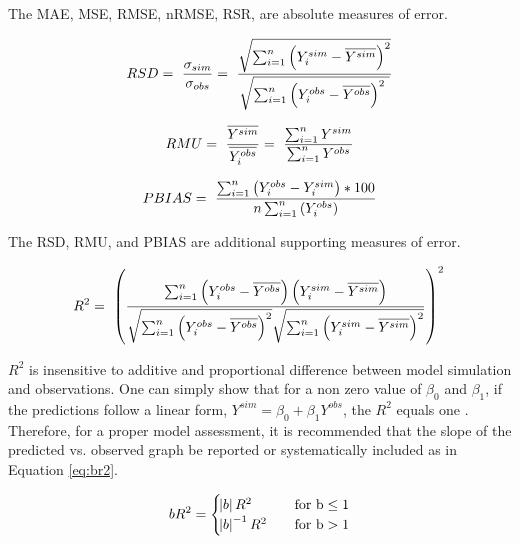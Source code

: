 The MAE, MSE, RMSE, nRMSE, RSR, are absolute measures of error. 

\begin{equation} 
	\label{eq:rsd}
	RSD =\ \frac{\sigma_{sim}}{\sigma_{obs}}=\ \frac{\sqrt{\sum^n_{i=1}{{\left(Y^{sim}_i-\overline{Y^{sim}}\right)^2}}}}{\sqrt{\sum^n_{i=1}{\left(Y^{obs}_i-\overline{Y^{obs}}\right)}^2\ }} \\
\end{equation}

\begin{equation} 
	\label{eq:rmu}
	RMU =\ \frac{\overline{Y^{sim}}}{\overline{Y^{obs}_i}}=\ \frac{\sum^n_{i=1}{Y^{sim}}}{\sum^n_{i=1}{Y^{obs}}} \\
\end{equation}

\begin{equation} 
	\label{eq:pbias}
	PBIAS =\ \frac{\sum^n_{i=1}{\left(Y^{obs}_i-Y^{sim}_i\right)*100}}{n \sum^n_{i=1}{(Y^{obs}_i)}} \\
\end{equation}

The RSD, RMU, and PBIAS are additional supporting measures of error.

\begin{equation} 
	\label{eq:r2}
	R^{2} = \ \left(\frac{\sum^n_{i=1}{\left(Y^{obs}_i-\overline{Y^{obs}}\right)\left(Y^{sim}_i-\overline{Y^{sim}}\right)}}{\sqrt{\sum^n_{i=1}{\left(Y^{obs}_i-\overline{Y^{obs}}\right)^2}}\sqrt{\sum^n_{i=1}{\left(Y^{sim}_i-\overline{Y^{sim}}\right)^2}}}\right)^2 \\
\end{equation}

$R^2$ is insensitive to additive and proportional difference between model simulation and observations. One can simply show that for a non zero value of $\beta_0$ and $\beta_1$, if the predictions follow a linear form, $Y^{sim}=\beta_0 + \beta_1 Y^{obs}$, the $R^2$ equals one \cite{legates1999evaluating}. Therefore, for a proper model assessment, it is recommended that the slope of the predicted vs. observed graph be reported or systematically included as in Equation \ref{eq:br2}. 

\begin{equation} 
	\label{eq:br2}   
	bR^{2} = 
	\begin{cases}
		\text{$\abs{b}R^2$} & \quad\text{for b}\le1\\
		\text{$\abs{b}^{-1}R^2$} &\quad\text{for b}>1 \\
	\end{cases}
\end{equation}

